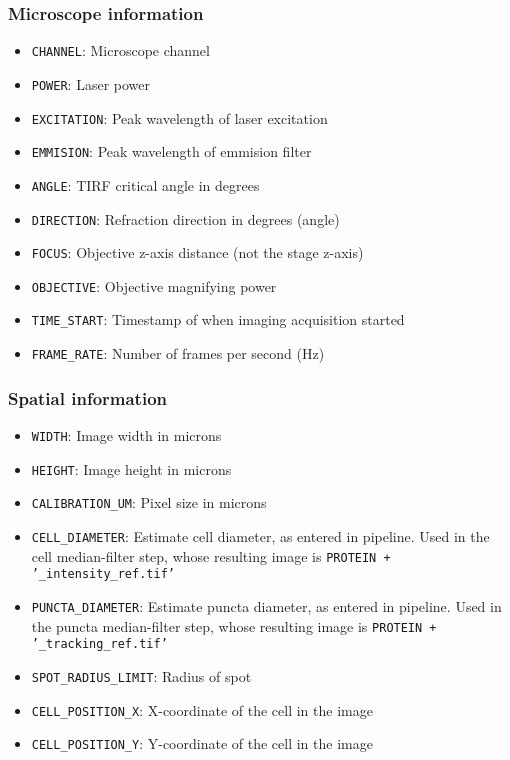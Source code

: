 \subsubsection*{Microscope information}
\begin{itemize}
    \item \texttt{CHANNEL}: Microscope channel
    \item \texttt{POWER}: Laser power
    \item \texttt{EXCITATION}: Peak wavelength of laser excitation
    \item \texttt{EMMISION}: Peak wavelength of emmision filter
    \item \texttt{ANGLE}: TIRF critical angle in degrees
    \item \texttt{DIRECTION}: Refraction direction in degrees (angle)
    \item \texttt{FOCUS}: Objective z-axis distance (not the stage z-axis)
    \item \texttt{OBJECTIVE}: Objective magnifying power
    \item \texttt{TIME\_START}: Timestamp of when imaging acquisition started
    \item \texttt{FRAME\_RATE}: Number of frames per second (Hz)
\end{itemize}

\subsubsection*{Spatial information}
\begin{itemize}
    \item \texttt{WIDTH}: Image width in microns
    \item \texttt{HEIGHT}: Image height in microns
    \item \texttt{CALIBRATION\_UM}: Pixel size in microns
    \item \texttt{CELL\_DIAMETER}: Estimate cell diameter, as entered in pipeline. Used in the cell median-filter step, whose resulting image is \texttt{PROTEIN + '\_intensity\_ref.tif'}
    \item \texttt{PUNCTA\_DIAMETER}: Estimate puncta diameter, as entered in pipeline. Used in the puncta median-filter step, whose resulting image is \texttt{PROTEIN + '\_tracking\_ref.tif'}
    \item \texttt{SPOT\_RADIUS\_LIMIT}: Radius of spot
    \item \texttt{CELL\_POSITION\_X}: X-coordinate of the cell in the image
    \item \texttt{CELL\_POSITION\_Y}: Y-coordinate of the cell in the image
\end{itemize}

